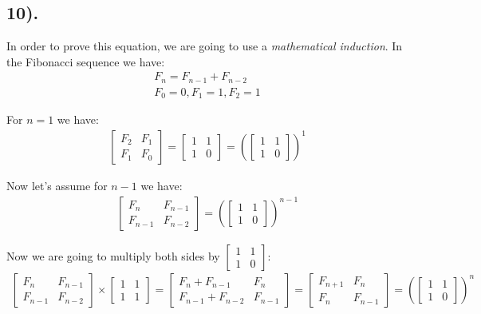 \documentclass[12pt]{article}
\begin{document}
\subsection*{10).}
In order to prove this equation, we are going to use a \textit{mathematical induction}. In the Fibonacci sequence we have:
\begin{gather*}
    F_{n} = F_{n-1} + F_{n-2} \\
    F_{0}=0, F_{1}=1, F_{2}=1
\end{gather*}

For $n=1$ we have:
\begin{gather*}
    \begin{bmatrix}
        F_{2} & F_{1} \\
        F_{1} & F_{0}
    \end{bmatrix}
    =
    \begin{bmatrix}
        1 & 1 \\
        1 & 0
    \end{bmatrix}
    =
    \left(\begin{bmatrix}
        1 & 1 \\
        1 & 0
    \end{bmatrix}\right)^1
\end{gather*}

Now let's assume for $n-1$ we have:
\begin{gather*}
    \begin{bmatrix}
        F_{n} & F_{n-1} \\
        F_{n-1} & F_{n-2}
    \end{bmatrix}
    =
    \left(\begin{bmatrix}
    1 & 1 \\
    1 & 0
    \end{bmatrix}\right)^{n-1}
\end{gather*}

Now we are going to multiply both sides by \( \begin{bmatrix} 1 & 1 \\ 1 & 0 \end{bmatrix} \):
\begin{gather*}
    \begin{bmatrix}
        F_{n} & F_{n-1} \\
        F_{n-1} & F_{n-2}
    \end{bmatrix}
    \times
    \begin{bmatrix}
        1 & 1 \\
        1 & 1
    \end{bmatrix}
    =
    \begin{bmatrix}
        F_{n}+F_{n-1} & F_{n} \\
        F_{n-1}+F_{n-2} & F_{n-1}
    \end{bmatrix}
    =
    \begin{bmatrix}
        F_{n+1} & F_{n} \\
        F_{n} & F_{n-1}
    \end{bmatrix}
    =
    \left(\begin{bmatrix}
    1 & 1 \\
    1 & 0
    \end{bmatrix}\right)^{n}
\end{gather*}
\end{document}
